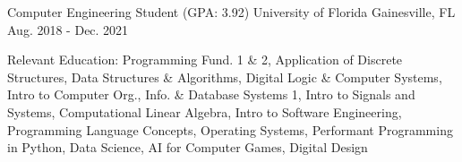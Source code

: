 \begin{cventries}
  \cventry
	{Computer Engineering Student (GPA: 3.92)}
	{University of Florida}
	{Gainesville, FL}
	{Aug. 2018 - Dec. 2021}
	{
		\begin{cvitems}
			\item {Relevant Education: Programming Fund. 1 \& 2, Application of Discrete Structures, Data Structures \& Algorithms, Digital Logic \& Computer Systems, Intro to Computer Org., Info. \& Database Systems 1, Intro to Signals and Systems, Computational Linear Algebra, Intro to Software Engineering, Programming Language Concepts, Operating Systems, Performant Programming in Python, Data Science, AI for Computer Games, Digital Design}
		\end{cvitems}
	}
\end{cventries}

